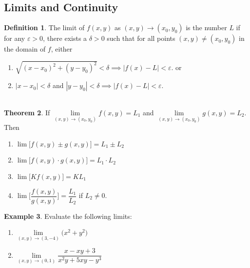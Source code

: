 \documentclass[11pt,a4paper]{article}
\theoremstyle{definition}
\newtheorem{thm}{Theorem}[subsection]
\newtheorem{defn}[thm]{Definition}
\newtheorem{exa}[thm]{Example}
\begin{document}
\subsection{Limits and Continuity}

\begin{defn}


The limit of $f(x,y)$ as $(x,y) \longrightarrow (x_0,y_0)$ is the number $L$ if for any $\varepsilon > 0$, there exists a $\delta >0$ such that for all points $(x,y) \neq  (x_0,y_0)$ in the domain of $f$, either
\begin{enumerate}
\item $\sqrt{(x - x_0)^2 + (y - y_0)^2} < \delta \implies \left|f(x) - L\right| < \varepsilon$. or 
\item $\left|x - x_0\right| < \delta$ and $\left|y - y_0\right| < \delta \implies \left|f(x) - L\right|< \varepsilon$.\\\\
\end{enumerate}
\end{defn}

\begin{thm}


If $\lim\limits_{(x,y) \rightarrow (x_0,y_0)}f(x,y) = L_1$ and $\lim\limits_{(x,y) \rightarrow (x_0,y_0)}g(x,y) = L_2$. Then 
\begin{enumerate}
\item $\lim \Big[f(x,y) \pm g(x,y)\Big] = L_1\pm L_2$

\item $\lim \Big[f(x,y)\cdot g(x,y)\Big] = L_1\cdot L_2$

\item $\lim \Big[Kf(x,y)\Big] = K L_1$

\item $\lim \Bigg[\dfrac{f(x,y)}{g(x,y)}\Bigg] = \dfrac{L_1}{L_2}$ if $L_2 \neq 0$.
\end{enumerate}
\end{thm}

\begin{exa}


Evaluate the following limits:
\begin{enumerate}
\item $\lim\limits_{(x,y) \rightarrow (3,-4)}\Big(x^2 + y^2\Big)$

\item $\lim\limits_{(x,y) \rightarrow (0,1)}\dfrac{x - xy + 3}{x^2y + 5xy - y^3}$
\end{enumerate}
\end{exa}
\end{document}
